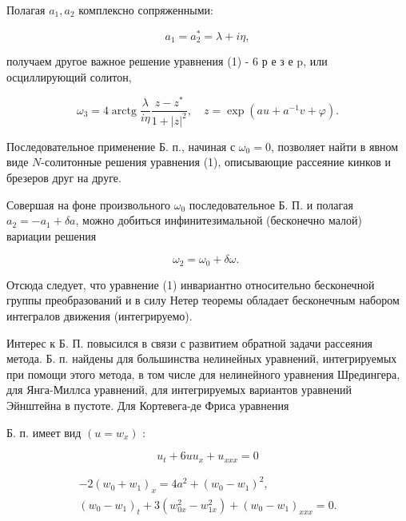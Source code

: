 \documentclass[10pt]{article}
\begin{document}
Полагая $a_{1}, a_{2}$ комплексно сопряженными:



\[

a_{1}=a_{2}^{*}=\lambda+i \eta,

\]



получаем другое важное решение уравнения (1) - 6 р е з е p, или осциллирующий солитон,



\[

\omega_{3}=4 \operatorname{arctg} \frac{\lambda}{i \eta} \frac{z-z^{*}}{1+|z|^{2}}, \quad z=\exp \left(a u+a^{-1} v+\varphi\right) .

\]



Последовательное применение Б. п., начиная с $\omega_{0}=0$, позволяет найти в явном виде $N$-солитонные решения уравнения (1), описывающие рассеяние кинков и брезеров друг на друге.



Совершая на фоне произвольного $\omega_{0}$ последовательное Б. П. и полагая $a_{2}=-a_{1}+\delta a$, можно добиться инфинитезимальной (бесконечно малой) вариации решения



\[

\omega_{2}=\omega_{0}+\delta \omega \text {. }

\]



Отсюда следует, что уравнение (1) инвариантно относительно бесконечной группы преобразований и в силу Нетер теоремы обладает бесконечным набором интегралов движения (интегрируемо).



Интерес к Б. П. повысился в связи с развитием обратной задачи рассеяния метода. Б. п. найдены для большинства нелинейных уравнений, интегрируемых при помощи этого метода, в том числе для нелинейного уравнения Шредингера, для Янга-Миллса уравнений, для интегрируемых вариантов уравнений Эйнштейна в пустоте. Для Кортевега-де Фриса уравнения



Б. п. имеет вид $\left(u=w_{x}\right)$ :



\[

u_{t}+6 u u_{x}+u_{x x x}=0

\]



\[

\begin{gathered}

-2\left(w_{0}+w_{1}\right)_{x}=4 a^{2}+\left(w_{0}-w_{1}\right)^{2}, \\

\left(w_{0}-w_{1}\right)_{t}+3\left(w_{0 x}^{2}-w_{1 x}^{2}\right)+\left(w_{0}-w_{1}\right)_{x x x}=0 .

\end{gathered}

\]
\end{document}

